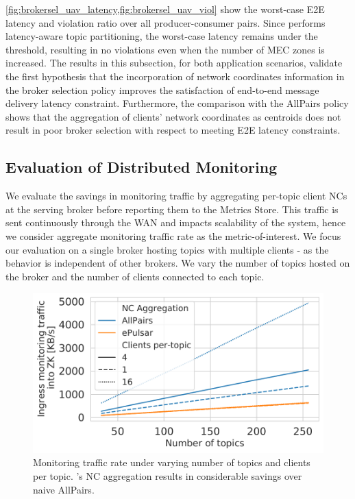 \cref{fig:brokersel_uav_latency,fig:brokersel_uav_viol} show the worst-case E2E latency and violation ratio over all producer-consumer pairs. Since \epulsar{} performs latency-aware topic partitioning, the worst-case latency remains under the threshold, resulting in no violations even when the number of MEC zones is increased. 
The results in this subsection, for both application scenarios, validate the first hypothesis that the incorporation of network coordinates information in the broker selection policy improves the satisfaction of end-to-end message delivery latency constraint. Furthermore, the comparison with the AllPairs policy shows that the aggregation of clients' network coordinates as centroids does not result in poor broker selection with respect to meeting E2E latency constraints.

\subsection{Evaluation of Distributed Monitoring}
We evaluate the savings in monitoring traffic by aggregating per-topic client NCs at the serving broker before reporting them to the Metrics Store. This traffic is sent continuously through the WAN and impacts scalability of the system, hence we consider aggregate monitoring traffic rate as the metric-of-interest. We focus our evaluation on a single broker hosting topics with multiple clients - as the behavior is independent of other brokers. We vary the number of topics hosted on the broker and the number of clients connected to each topic.
\begin{figure}[ht]
  \centering
  \includegraphics[width=0.9\linewidth]{figures/epulsar/evals/zk_traffic_rate__.pdf}  
  \caption{Monitoring traffic rate under varying number of topics and clients per topic. \epulsar's NC aggregation results in considerable savings over naive AllPairs.}
    \label{fig:zk_traffic_rate}
\end{figure}

